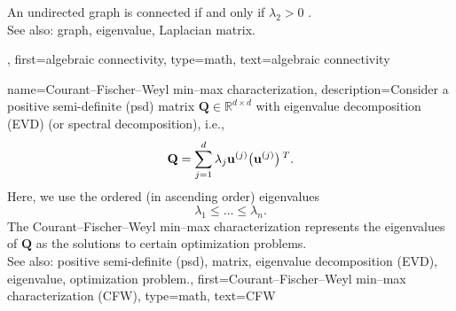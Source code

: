 {{{\begin{figure}[H]
\end{figure}
	An undirected graph is connected if and only if 
		$\lambda_{2} >0$ \cite{ChungSpecGraphTheory,Spielman2019}. 
				\\
		See also: graph, eigenvalue, Laplacian matrix.},
	first={algebraic connectivity},
	type=math,
	text={algebraic connectivity}
}


{name={Courant–Fischer–Weyl min–max characterization}, 
	description={Consider a positive semi-definite (psd) 
		matrix $\mathbf{Q} \in \mathbb{R}^{d \times d}$ with 
		eigenvalue decomposition (EVD) (or spectral decomposition), i.e.,
		$$\mathbf{Q} = \sum_{j=1}^{d} \lambda_{j} {\bf u}^{(j)} \big(  {\bf u}^{(j)}  \big)\,^{T}.$$ 
		Here, we use the ordered (in ascending order) eigenvalues 
		\begin{equation}
			\nonumber
		 	\lambda_{1}  \leq \ldots \leq \lambda_{n}. 
		\end{equation}
		The Courant–Fischer–Weyl min–max characterization \cite[Th. 8.1.2]{GolubVanLoanBook} 
		represents the eigenvalues of $\mathbf{Q}$ as the solutions to certain optimization problems.
			\\
		See also: positive semi-definite (psd), matrix, eigenvalue decomposition (EVD), eigenvalue, optimization problem.}, 
	first={Courant–Fischer–Weyl min–max characterization (CFW)}, 
	type=math,
	text={CFW}
}

}
